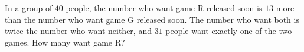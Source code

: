 In a group of $40$ people, the number who want game R released soon is $13$ more than the number who want game G released soon. The number who want both is twice the number who want neither, and $31$ people want exactly one of the two games. How many want game R?
